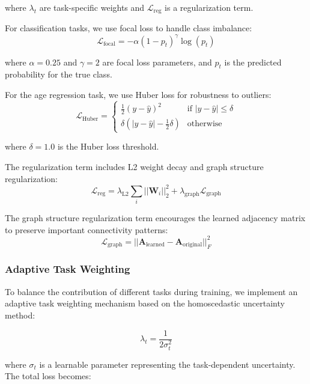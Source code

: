 \documentclass[10pt,journal,compsoc]{IEEEtran}
\begin{document}
where $\lambda_t$ are task-specific weights and $\mathcal{L}_{\text{reg}}$ is a regularization term.

For classification tasks, we use focal loss to handle class imbalance:
\begin{equation}
\mathcal{L}_{\text{focal}} = -\alpha (1-p_t)^\gamma \log(p_t)
\end{equation}

where $\alpha = 0.25$ and $\gamma = 2$ are focal loss parameters, and $p_t$ is the predicted probability for the true class.

For the age regression task, we use Huber loss for robustness to outliers:
\begin{equation}
\mathcal{L}_{\text{Huber}} = \begin{cases}
\frac{1}{2}(y - \hat{y})^2 & \text{if } |y - \hat{y}| \leq \delta \\
\delta(|y - \hat{y}| - \frac{1}{2}\delta) & \text{otherwise}
\end{cases}
\end{equation}

where $\delta = 1.0$ is the Huber loss threshold.

The regularization term includes L2 weight decay and graph structure regularization:
\begin{equation}
\mathcal{L}_{\text{reg}} = \lambda_{\text{L2}} \sum_{i} ||\mathbf{W}_i||_2^2 + \lambda_{\text{graph}} \mathcal{L}_{\text{graph}}
\end{equation}

The graph structure regularization term encourages the learned adjacency matrix to preserve important connectivity patterns:
\begin{equation}
\mathcal{L}_{\text{graph}} = ||\mathbf{A}_{\text{learned}} - \mathbf{A}_{\text{original}}||_F^2
\end{equation}

\subsubsection{Adaptive Task Weighting}

To balance the contribution of different tasks during training, we implement an adaptive task weighting mechanism based on the homoscedastic uncertainty method:

\begin{equation}
\lambda_t = \frac{1}{2\sigma_t^2}
\end{equation}

where $\sigma_t$ is a learnable parameter representing the task-dependent uncertainty. The total loss becomes:
\end{document}
